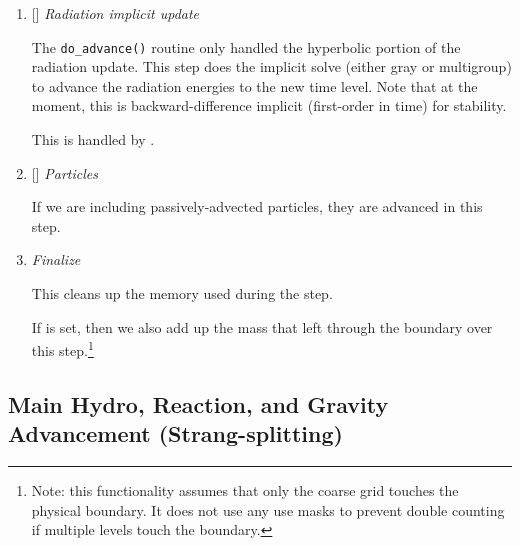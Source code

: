 \begin{enumerate}
\item {[]} {\em Radiation implicit update} 

  The {\tt do\_advance()} routine only handled the hyperbolic
  portion of the radiation update.  This step does the implicit solve
  (either gray or multigroup) to advance the radiation energies to the 
  new time level.  Note that at the moment, this is backward-difference
  implicit (first-order in time) for stability.

  This is handled by .

\item {[]} {\em Particles} 

  If we are including passively-advected particles, they are
  advanced in this step.

\item {\em Finalize}

  This cleans up the memory used during the step.  

  If  is set, then we also add up
  the mass that left through the boundary over this
  step.\footnote{Note: this functionality assumes that only the
    coarse grid touches the physical boundary.  It does not use any
    use masks to prevent double counting if multiple levels touch
    the boundary.}

\end{enumerate}

\subsection{Main Hydro, Reaction, and Gravity Advancement (Strang-splitting)}

